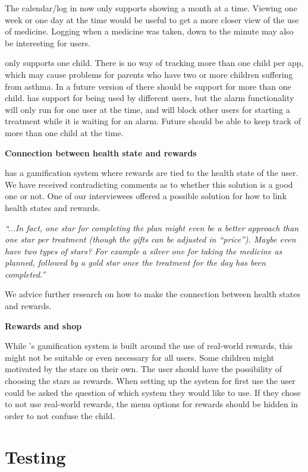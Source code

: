The calendar/log in \app{} now only supports showing a month at a time. Viewing one week or one day at the time would be useful to get a more closer view of the use of medicine. Logging when a medicine was taken, down to the minute may also be interesting for users. 

\app{} only supports one child. There is no way of tracking more than one child per app, which may cause problems for parents who have two or more children suffering from asthma. In a future version of \app{} there should be support for more than one child. \ab{} has support for being used by different users, but the alarm functionality will only run for one user at the time, and will block other users for starting a treatment while it is waiting for an alarm. Future \ab{} should be able to keep track of more than one child at the time. 

\textbf{Connection between health state and rewards}

\app{} has a gamification system where rewards are tied to the health state of the user. We have received contradicting comments as to whether this solution is a good one or not. One of our interviewees offered a possible solution for how to link health states and rewards.

\emph{``...In fact, one star for completing the plan might even be a better approach than one star per treatment (though the gifts can be adjusted in ``price''). Maybe even have two types of stars? For example a silver one for taking the medicine as planned, followed by a gold star once the treatment for the day has been completed.''}

We advice further research on how to make the connection between health states and rewards. 

\textbf{Rewards and shop}

While \app{}'s gamification system is built around the use of real-world rewards, this might not be suitable or even necessary for all users. Some children might motivated by the stars on their own. The user should have the possibility of choosing the stars as rewards. When setting up the system for first use the user could be asked the question of which system they would like to use. If they chose to not use real-world rewards, the menu options for rewards should be hidden in order to not confuse the child. 

\section{Testing}
\label{sec:furtherworktesting}

